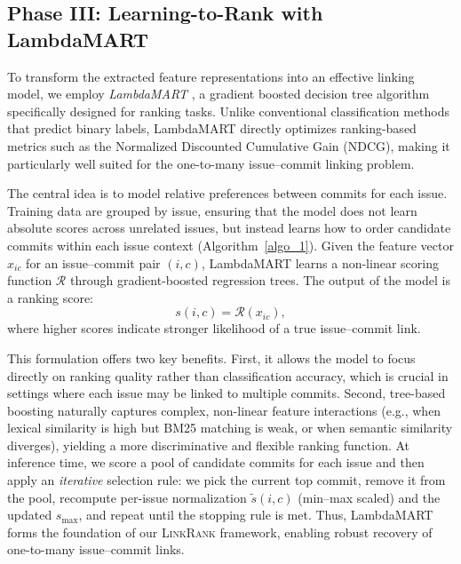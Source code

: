 \subsection{Phase III: Learning-to-Rank with LambdaMART}
To transform the extracted feature representations into an effective linking model, we employ \textit{LambdaMART} \cite{lambda}, a gradient boosted decision tree algorithm specifically designed for ranking tasks. Unlike conventional classification methods that predict binary labels, LambdaMART directly optimizes ranking-based metrics such as the Normalized Discounted Cumulative Gain (NDCG), making it particularly well suited for the one-to-many issue--commit linking problem.


The central idea is to model relative preferences between commits for each issue. Training data are grouped by issue, ensuring that the model does not learn absolute scores across unrelated issues, but instead learns how to order candidate commits within each issue context (Algorithm~\ref{algo_1}). Given the feature vector $x_{ic}$ for an issue--commit pair $(i,c)$, LambdaMART learns a non-linear scoring function $\mathcal{R}$ through gradient-boosted regression trees. The output of the model is a ranking score:
\[
s(i,c) = \mathcal{R}(x_{ic}),
\]
where higher scores indicate stronger likelihood of a true issue--commit link.

This formulation offers two key benefits. First, it allows the model to focus directly on ranking quality rather than classification accuracy, which is crucial in settings where each issue may be linked to multiple commits. Second, tree-based boosting naturally captures complex, non-linear feature interactions (e.g., when lexical similarity is high but BM25 matching is weak, or when semantic similarity diverges), yielding a more discriminative and flexible ranking function. At inference time, we score a pool of candidate commits for each issue and then apply an \emph{iterative} selection rule: we pick the current top commit, remove it from the pool, recompute per-issue normalization $\tilde{s}(i,c)$ (min--max scaled) and the updated $s_{\max}$, and repeat until the stopping rule is met. Thus, LambdaMART forms the foundation of our \textsc{LinkRank} framework, enabling robust recovery of one-to-many issue--commit links.


